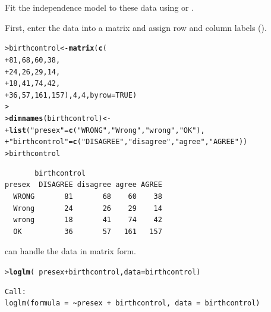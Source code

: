 \documentclass[10pt]{report}\usepackage[]{graphicx}\usepackage[]{color}
\makeatletter
\newcommand{\hlnum}[1]{\textcolor[rgb]{0.686,0.059,0.569}{#1}}%
\newcommand{\hlstr}[1]{\textcolor[rgb]{0.192,0.494,0.8}{#1}}%
\newcommand{\hlopt}[1]{\textcolor[rgb]{0,0,0}{#1}}%
\newcommand{\hlstd}[1]{\textcolor[rgb]{0.345,0.345,0.345}{#1}}%
\newcommand{\hlkwb}[1]{\textcolor[rgb]{0.69,0.353,0.396}{#1}}%
\newcommand{\hlkwc}[1]{\textcolor[rgb]{0.333,0.667,0.333}{#1}}%
\newcommand{\hlkwd}[1]{\textcolor[rgb]{0.737,0.353,0.396}{\textbf{#1}}}%
\newenvironment{kframe}{%
 \def\at@end@of@kframe{}%
 \ifinner\ifhmode%
  \def\at@end@of@kframe{\end{minipage}}%
  \begin{minipage}{\columnwidth}%
 \fi\fi%
 \def\FrameCommand##1{\hskip\@totalleftmargin \hskip-\fboxsep
 \colorbox{shadecolor}{##1}\hskip-\fboxsep
     \hskip-\linewidth \hskip-\@totalleftmargin \hskip\columnwidth}%
 \MakeFramed {\advance\hsize-\width
   \@totalleftmargin\z@ \linewidth\hsize
   \@setminipage}}%
 {\par\unskip\endMakeFramed%
 \at@end@of@kframe}
\newenvironment{knitrout}{}{} %
\renewenvironment{knitrout}{\small\renewcommand{\baselinestretch}{.85}}{} %
\makeatother
\begin{document}
\begin{Exercises}
  \begin{enumerate*}
    \item Fit the independence model to these data using  or .
    \begin{ans}
    First, enter the data into a matrix and assign row and column labels ().
\begin{knitrout}\footnotesize
{}\color{fgcolor}\begin{kframe}
\begin{alltt}
\hlstd{> }\hlstd{birthcontrol} \hlkwb{<-} \hlkwd{matrix}\hlstd{(}\hlkwd{c}\hlstd{(}
\hlstd{+ } \hlnum{81}\hlstd{,} \hlnum{68}\hlstd{,} \hlnum{60}\hlstd{,} \hlnum{38}\hlstd{,}
\hlstd{+ } \hlnum{24}\hlstd{,} \hlnum{26}\hlstd{,} \hlnum{29}\hlstd{,} \hlnum{14}\hlstd{,}
\hlstd{+ } \hlnum{18}\hlstd{,} \hlnum{41}\hlstd{,} \hlnum{74}\hlstd{,} \hlnum{42}\hlstd{,}
\hlstd{+ } \hlnum{36}\hlstd{,} \hlnum{57}\hlstd{,} \hlnum{161}\hlstd{,} \hlnum{157}\hlstd{),} \hlnum{4}\hlstd{,} \hlnum{4}\hlstd{,} \hlkwc{byrow}\hlstd{=}\hlnum{TRUE}\hlstd{)}
\hlstd{> }
\hlstd{> }\hlkwd{dimnames}\hlstd{(birthcontrol)} \hlkwb{<-}
\hlstd{+ }        \hlkwd{list}\hlstd{(}\hlstr{"presex"} \hlstd{=} \hlkwd{c}\hlstd{(}\hlstr{"WRONG"}\hlstd{,} \hlstr{"Wrong"}\hlstd{,} \hlstr{"wrong"}\hlstd{,} \hlstr{"OK"}\hlstd{),}
\hlstd{+ }             \hlstr{"birthcontrol"} \hlstd{=} \hlkwd{c}\hlstd{(}\hlstr{"DISAGREE"}\hlstd{,} \hlstr{"disagree"}\hlstd{,} \hlstr{"agree"}\hlstd{,} \hlstr{"AGREE"}\hlstd{))}
\hlstd{> }\hlstd{birthcontrol}
\end{alltt}
\begin{verbatim}
       birthcontrol
presex  DISAGREE disagree agree AGREE
  WRONG       81       68    60    38
  Wrong       24       26    29    14
  wrong       18       41    74    42
  OK          36       57   161   157
\end{verbatim}
\end{kframe}
\end{knitrout}
     can handle the data in matrix form.  
\begin{knitrout}\footnotesize
{}\color{fgcolor}\begin{kframe}
\begin{alltt}
\hlstd{> }\hlkwd{loglm}\hlstd{(}\hlopt{~}\hlstd{presex} \hlopt{+} \hlstd{birthcontrol,} \hlkwc{data}\hlstd{=birthcontrol)}
\end{alltt}
\begin{verbatim}
Call:
loglm(formula = ~presex + birthcontrol, data = birthcontrol)


\end{verbatim}
\end{kframe}
\end{knitrout}
\end{ans}
\end{enumerate*}
\end{Exercises}
\end{document}
